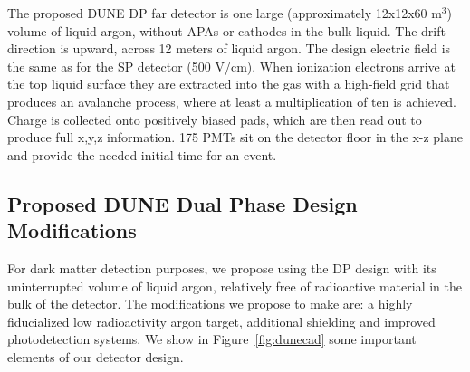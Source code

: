 \documentclass[a4paper,11pt]{article}
\begin{document}
The proposed DUNE DP far detector is one large (approximately 12x12x60 m$^3$) volume of liquid argon, without APAs or cathodes in the bulk liquid. The drift direction is upward, across 12 meters of liquid argon. The design electric field is the same as for the SP detector (500 V/cm). When ionization electrons arrive at the top liquid surface they are extracted into the gas with a high-field grid that produces an avalanche process, where at least a multiplication of ten is achieved. Charge is collected onto positively biased pads, which are then read out to produce full x,y,z information. 175 PMTs sit on the detector floor in the x-z plane and provide the needed initial time for an event.

\subsection{Proposed DUNE Dual Phase Design Modifications }
For dark matter detection purposes, we propose using the DP design with its uninterrupted volume of liquid argon, relatively free of radioactive material in the bulk of the detector. The modifications we propose to make are: a highly fiducialized low radioactivity argon target, additional shielding and improved photodetection systems. We show in Figure~\ref{fig:dunecad} some important elements of our detector design.
\end{document}
